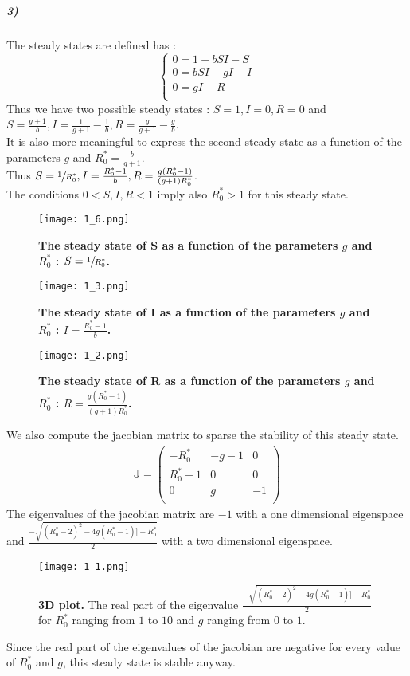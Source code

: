 \documentclass{article}
\begin{document}
\subparagraph{3)}
The steady states are defined has :
$$ \displaystyle \left \{
    \begin{array}{ll}
        0=1-b S I-S\\
		0= b S I - g I -I \\
		0= g I-R\\
    \end{array}
    \right.
    $$
    Thus we have two possible steady states : 
$ S=1,I=0,R=0$ and
		$ S=\frac{g+1}{b},I=\frac{1}{g+1}-\frac{1}{b},R=\frac{g}{g+1}-\frac{g}{b} $. 
				\\
		It is also more meaningful to express the second steady state as a function of the parameters $g$ and $R_0^*=\frac{b}{g+1}$. \\
Thus 
$ S=\sfrac{1}{R_0^*},I=\frac{R_0^* -1}{b},R=\frac{g(R_0^*-1)}{(g+1)R_0^*}$. \\

The conditions $0<S,I,R<1$ imply also $R_0^* >1$ for this steady state. \\
\begin{figure}[H]
	  \centering
  	\texttt{[image: 1\_6.png]}
  	  	\caption{\textbf{The steady state of S as a function of the parameters  $g$ and $R_0^*$ : $S=\sfrac{1}{R_0^*}$.}}
  	\texttt{[image: 1\_3.png]}
  	  	\caption{\textbf{The steady state of I as a function of the parameters  $g$ and $R_0^*$ : $I=\frac{R_0^* -1}{b}$.}}
  	\texttt{[image: 1\_2.png]}
  	\caption{\textbf{The steady state of R as a function of the parameters  $g$ and $R_0^*$ : $R=\frac{g(R_0^*-1)}{(g+1)R_0^*}$.}}
	\end{figure}	


We also compute the jacobian matrix to sparse the stability of this steady state. 
\begin{align*}
\mathbb{J}=
\begin{pmatrix}
-R_0^* & -g-1 & 0   \\
R_0^* -1 & 0 & 0  \\
0 & g & -1   \\
\end{pmatrix}
\end{align*}
The eigenvalues of the jacobian matrix are $-1$ with a one dimensional eigenspace and $\frac{-\sqrt{(R_0^*-2)^2-4 g (R_0^*-1)]-R_0^*}}{2}$ with a two dimensional eigenspace.

\begin{figure}[H]
	  \centering
  	\texttt{[image: 1\_1.png]}
  	\caption{\textbf{3D plot.} The real part of the eigenvalue $\frac{-\sqrt{(R_0^*-2)^2-4 g (R_0^*-1)]-R_0^*}}{2}$ for $R_0^*$ ranging from $1$ to $10$ and $g$ ranging from $0$ to $1$.}
	\end{figure}
Since the real part of the eigenvalues of the jacobian are negative for every value of $R_0^*$ and $g$, this steady state is stable anyway.\\
\end{document}
